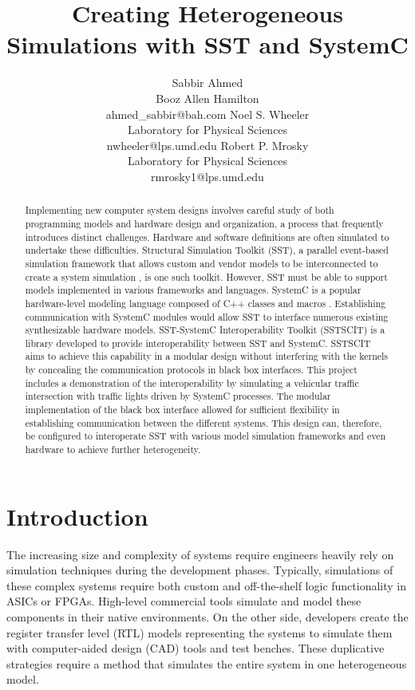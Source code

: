 \documentclass{article}
\title{Creating Heterogeneous Simulations with SST and SystemC}
\author{
  Sabbir Ahmed \\
  Booz Allen Hamilton \\
  ahmed\_sabbir@bah.com
  \And
  Noel S. Wheeler \\
  Laboratory for Physical Sciences \\
  nwheeler@lps.umd.edu
  \And
  Robert P. Mrosky \\
  Laboratory for Physical Sciences \\
  rmrosky1@lps.umd.edu
}
\begin{document}
  \maketitle

  \begin{abstract}
    Implementing new computer system designs involves careful study of both programming models and
    hardware design and organization, a process that frequently introduces distinct challenges.
    Hardware and software definitions are often simulated to undertake these difficulties.
    Structural Simulation Toolkit (SST), a parallel event-based simulation framework that allows
    custom and vendor models to be interconnected to create a system simulation \cite{sst}, is one
    such toolkit. However, SST must be able to support models implemented in various frameworks and
    languages. SystemC is a popular hardware-level modeling language composed of C++ classes and
    macros \cite{sysc}. Establishing communication with SystemC modules would allow SST to interface
    numerous existing synthesizable hardware models. SST-SystemC Interoperability Toolkit (SSTSCIT)
    is a library developed to provide interoperability between SST and SystemC. SSTSCIT aims to
    achieve this capability in a modular design without interfering with the kernels by concealing
    the communication protocols in black box interfaces. This project includes a demonstration of
    the interoperability by simulating a vehicular traffic intersection with traffic lights driven
    by SystemC processes. The modular implementation of the black box interface allowed for
    sufficient flexibility in establishing communication between the different systems. This design
    can, therefore, be configured to interoperate SST with various model simulation frameworks and
    even hardware to achieve further heterogeneity.
  \end{abstract}

  \section{Introduction}  
  The increasing size and complexity of systems require engineers heavily rely on simulation
  techniques during the development phases. Typically, simulations of these complex systems require
  both custom and off-the-shelf logic functionality in ASICs or FPGAs. High-level commercial tools
  simulate and model these components in their native environments. On the other side, developers
  create the register transfer level (RTL) models representing the systems to simulate them with
  computer-aided design (CAD) tools and test benches. These duplicative strategies require a method
  that simulates the entire system in one heterogeneous model.
\end{document}
